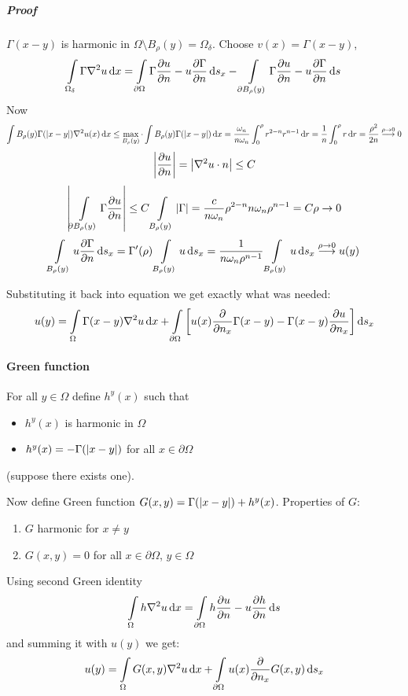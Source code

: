 \subparagraph{Proof}
$\Gamma(x-y)$ is harmonic in $\Omega \setminus B_\rho(y) = \Omega_\delta$.
Choose $v(x) = \Gamma(x-y)$,
$$\int\limits_{\Omega_\delta} \Gamma\laplacian{u} \dd{x} = \int\limits_{\partial \Omega} \Gamma \pdv{u}{n} - u \pdv{\Gamma}{n} \dd{s_x} -  \int\limits_{\partial B_\rho(y)} \Gamma \pdv{u}{n} - u \pdv{\Gamma}{n} \dd{s} $$
Now
$$\int\limits{B_\rho(y)} \Gamma(\abs{x-y}) \laplacian{u(x)} \dd{x} \leq \max\limits_{B_\rho(y)} \cdot \int\limits{B_\rho(y)} \Gamma(\abs{x-y})  \dd{x} = \frac{\omega_n}{n\omega_n} \int_0^\rho r^{2-n}r^{n-1} \dd{r} = \frac{1}{n} \int_0^\rho  r \dd{r} = \frac{\rho^2}{2n} \stackrel{\rho\to 0}{\longrightarrow} 0 $$
$$\abs{\pdv{u}{n}} = \abs{\laplacian{u} \cdot n} \leq C $$
$$\abs{ \int\limits_{\partial B_\rho(y)} \Gamma \pdv{u}{n}} \leq C \int\limits_{B_\rho(y)} \abs{\Gamma} = \frac{c}{n\omega_n} \rho^{2-n} n\omega_n \rho^{n-1} =C \rho \to 0$$
$$\int\limits_{B_\rho(y)} u \pdv{\Gamma}{n} \dd{s_x} = \Gamma'(\rho)\int\limits_{B_\rho(y)} u \dd{s_x} = \frac{1}{n\omega_n \rho^{n-1}} \int\limits_{B_\rho(y)} u \dd{s_x}\stackrel{\rho\to 0}{\longrightarrow} u(y) $$

Substituting it back into equation we get exactly what was needed:
$$u(y) = \int\limits_{\Omega} \Gamma(x-y) \laplacian{u} \dd{x} + \int\limits_{\partial \Omega} \qty[u(x) \pdv{n_x}\Gamma(x-y) - \Gamma(x-y) \pdv{u}{n_x}] \dd{s_x}$$

\paragraph{Green function}
For all $y\in \Omega$ define $h^y(x)$ such that
\begin{itemize}
	\item $h^y(x)$ is harmonic in $\Omega$
	\item $h^y(x) = -\Gamma(\abs{x-y})$ for all $x\in \partial \Omega$ 
\end{itemize}
(suppose there exists one).

Now define Green function $G(x,y) = \Gamma(\abs{x-y}) + h^y(x)$. Properties of $G$:
\begin{enumerate}
	\item $G$ harmonic for $x\neq y$
	\item $G(x,y) = 0$ for all $x\in \partial \Omega$, $y\in \Omega$
\end{enumerate}

Using second Green identity
$$\int\limits_{\Omega} h\laplacian{u} \dd{x} = \int\limits_{\partial \Omega} h \pdv{u}{n} - u \pdv{h}{n} \dd{s} $$
and summing it with $u(y)$ we get:
$$u(y) = \int\limits_{\Omega} G(x,y) \laplacian{u} \dd{x} + \int\limits_{\partial \Omega} u(x) \pdv{n_x}G(x,y) \dd{s_x}$$
